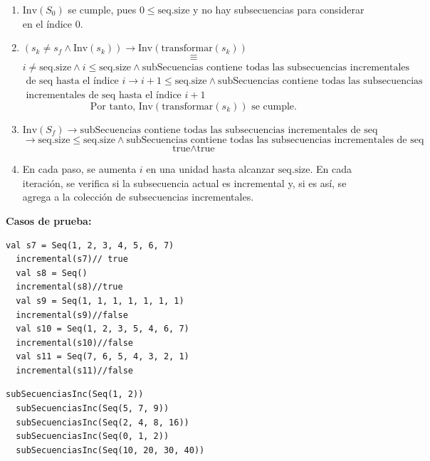 \documentclass[12pt, a4paper]{article}
\begin{document}
\begin{enumerate}
  \item \( \text{Inv}(S_0) \) se cumple, pues \( 0 \leq \text{seq.size} \) y no hay subsecuencias para considerar en el índice 0.
  \item \( (s_k \neq s_f \land \text{Inv}(s_k)) \rightarrow \text{Inv}(\text{transformar}(s_k)) \)
  \[\equiv\]
  \( i \neq \text{seq.size} \land i \leq \text{seq.size} \land \text{subSecuencias} \text{ contiene todas las subsecuencias incrementales} \)
  \( \text{ de } \text{seq} \text{ hasta el índice } i \rightarrow i+1 \leq \text{seq.size} \land \text{subSecuencias} \text{ contiene todas las subsecuencias} \)
  \( \text{ incrementales de } \text{seq} \text{ hasta el índice } i+1 \)
  \[ \text{Por tanto, } \text{Inv}(\text{transformar}(s_k)) \text{ se cumple.} \]
  \item \( \text{Inv}(S_f) \rightarrow \text{subSecuencias} \text{ contiene todas las subsecuencias incrementales de } \text{seq} \)
  \[\rightarrow \text{seq.size} \leq \text{seq.size} \land \text{subSecuencias} \text{ contiene todas las subsecuencias incrementales de } \text{seq} \]
  \[ \text{true} \land \text{true} \]
  \item En cada paso, se aumenta \( i \) en una unidad hasta alcanzar \( \text{seq.size} \). En cada iteración, se verifica si la subsecuencia actual es incremental y, si es así, se agrega a la colección de subsecuencias incrementales.
\end{enumerate}
\textbf{Casos de prueba: \\}
\begin{lstlisting}[caption=Casos de prueba para la función incremental, label=lst:scala_code]
  val s7 = Seq(1, 2, 3, 4, 5, 6, 7)
  incremental(s7)// true
  val s8 = Seq()
  incremental(s8)//true
  val s9 = Seq(1, 1, 1, 1, 1, 1, 1)
  incremental(s9)//false
  val s10 = Seq(1, 2, 3, 5, 4, 6, 7)
  incremental(s10)//false
  val s11 = Seq(7, 6, 5, 4, 3, 2, 1)
  incremental(s11)//false
\end{lstlisting}
\begin{lstlisting}[caption=Casos de prueba para la función subSecuenciasInc, label=lst:scala_code]
  subSecuenciasInc(Seq(1, 2))
  subSecuenciasInc(Seq(5, 7, 9))
  subSecuenciasInc(Seq(2, 4, 8, 16))
  subSecuenciasInc(Seq(0, 1, 2))
  subSecuenciasInc(Seq(10, 20, 30, 40))
\end{lstlisting}
\end{document}

